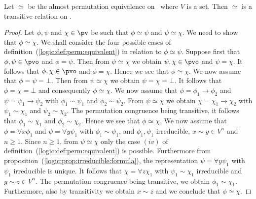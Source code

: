 \begin{prop}\label{logic:prop:perm:transitive}
Let $\simeq$ be the almost permutation equivalence on \pv\ where $V$
is a set. Then $\simeq$ is a transitive relation on \pv.
\end{prop}
\begin{proof}
Let $\phi,\psi$ and $\chi\in\pv$ be such that $\phi\simeq\psi$ and
$\psi\simeq\chi$. We need to show that $\phi\simeq\chi$. We shall
consider the four possible cases of
definition~(\ref{logic:def:perm:equivalent}) in relation to
$\phi\simeq\psi$. Suppose first that $\phi,\psi\in\pvo$ and
$\phi=\psi$. Then from $\psi\simeq\chi$ we obtain $\psi,\chi\in\pvo$
and $\psi=\chi$. It follows that $\phi,\chi\in\pvo$ and $\phi=\chi$.
Hence we see that $\phi\simeq\chi$. We now assume that
$\phi=\psi=\bot$. Then from $\psi\simeq\chi$ we obtain
$\psi=\chi=\bot$. It follows that $\phi=\chi=\bot$ and consequently
$\phi\simeq\chi$. We now assume that $\phi=\phi_{1}\to\phi_{2}$ and
$\psi=\psi_{1}\to\psi_{2}$ with $\phi_{1}\sim\psi_{1}$ and
$\phi_{2}\sim\psi_{2}$. From $\psi\simeq\chi$ we obtain
$\chi=\chi_{1}\to\chi_{2}$ with $\psi_{1}\sim\chi_{1}$ and
$\psi_{2}\sim\chi_{2}$. The permutation congruence being transitive,
it follows that $\phi_{1}\sim\chi_{1}$ and $\phi_{2}\sim\chi_{2}$.
Hence we see that $\phi\simeq\chi$. We now assume that $\phi=\forall
x\phi_{1}$ and $\psi=\forall y\psi_{1}$ with $\phi_{1}\sim\psi_{1}$,
and $\phi_{1},\psi_{1}$ irreducible, $x\sim y\in V^{n}$ and $n\geq
1$. Since $n\geq 1$, from $\psi\simeq\chi$ only the case $(iv)$ of
definition~(\ref{logic:def:perm:equivalent}) is possible.
Furthermore from proposition~(\ref{logic:prop:irreducible:formula}),
the representation $\psi=\forall y\psi_{1}$ with $\psi_{1}$
irreducible is unique. It follows that $\chi=\forall z\chi_{1}$ with
$\psi_{1}\sim\chi_{1}$ irreducible and $y\sim z\in V^{n}$. The
permutation congruence being transitive, we obtain
$\phi_{1}\sim\chi_{1}$. Furthermore, also by transitivity we obtain
$x\sim z$ and we conclude that $\phi\simeq\chi$.
\end{proof}

